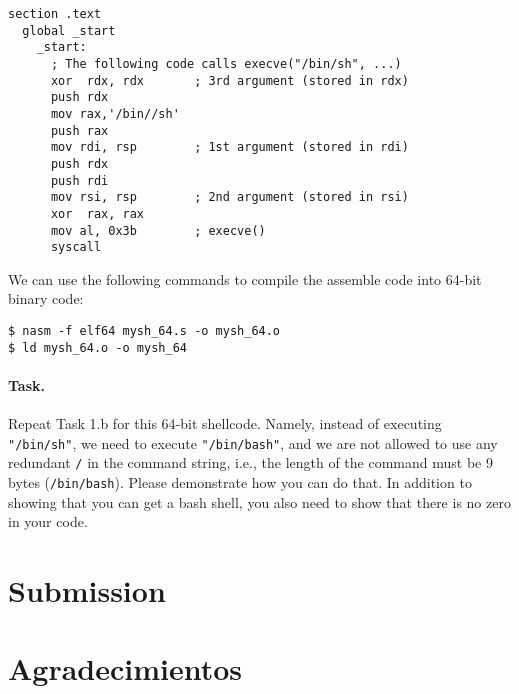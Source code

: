 \begin{lstlisting}[caption={A 64-bit shellcode \texttt{mysh\_64.s}}]
  section .text
  global _start
    _start:
      ; The following code calls execve("/bin/sh", ...)
      xor  rdx, rdx       ; 3rd argument (stored in rdx)
      push rdx
      mov rax,'/bin//sh'  
      push rax
      mov rdi, rsp        ; 1st argument (stored in rdi)
      push rdx
      push rdi
      mov rsi, rsp        ; 2nd argument (stored in rsi)
      xor  rax, rax
      mov al, 0x3b        ; execve()
      syscall
\end{lstlisting}

We can use the following commands to compile the assemble code into
64-bit binary code: 

\begin{lstlisting}
$ nasm -f elf64 mysh_64.s -o mysh_64.o
$ ld mysh_64.o -o mysh_64
\end{lstlisting}

\paragraph{Task.}
Repeat Task 1.b for this 64-bit shellcode. Namely, 
instead of executing \texttt{"/bin/sh"}, we need to execute
\texttt{"/bin/bash"}, and we are not allowed to use
any redundant \texttt{/} in the command string, 
i.e., the length of the command must be 9 bytes (\texttt{/bin/bash}).
Please demonstrate how you can do that.
In addition to showing that you can get a bash shell, you also
need to show that there is no zero in your code. 

\section{Submission}



\section*{Agradecimientos}












